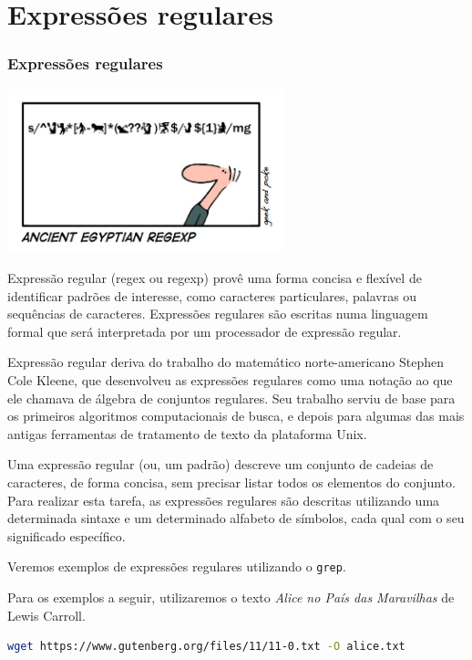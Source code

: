 \section{Expressões regulares}

\begin{frame}
\frametitle{Expressões regulares}

\includegraphics[width=0.6\textwidth,height=0.5\textheight,keepaspectratio]{figures/regexp01.jpg}

\framebreak

Expressão regular (regex ou regexp) provê uma forma concisa e flexível de identificar
padrões de interesse, como caracteres particulares, palavras ou sequências de
caracteres. Expressões regulares são escritas numa linguagem formal que será
interpretada por um processador de expressão regular.

Expressão regular deriva do trabalho do matemático norte-americano Stephen Cole Kleene,
que desenvolveu as expressões regulares como uma notação ao que ele chamava de álgebra
de conjuntos regulares. Seu trabalho serviu de base para os primeiros algoritmos
computacionais de busca, e depois para algumas das mais antigas ferramentas de tratamento
de texto da plataforma Unix.

\framebreak

Uma expressão regular (ou, um padrão) descreve um conjunto de cadeias de caracteres,
de forma concisa, sem precisar listar todos os elementos do conjunto.
Para realizar esta tarefa, as expressões regulares são descritas utilizando uma
determinada sintaxe e um determinado alfabeto de símbolos, cada qual com o seu significado
específico.

\framebreak

Veremos exemplos de expressões regulares utilizando o \texttt{grep}.

Para os exemplos a seguir, utilizaremos o texto \emph{Alice no País das Maravilhas} de Lewis Carroll.

\begin{lstlisting}[language=bash, label=lst-grep-prep, caption={Download do texto no Projeto Gutenberg.}, postbreak=\mbox{$\hookrightarrow$\space}, basicstyle=\fontsize{8}{10}\selectfont\ttfamily]
wget https://www.gutenberg.org/files/11/11-0.txt -O alice.txt
\end{lstlisting}


\end{frame}
